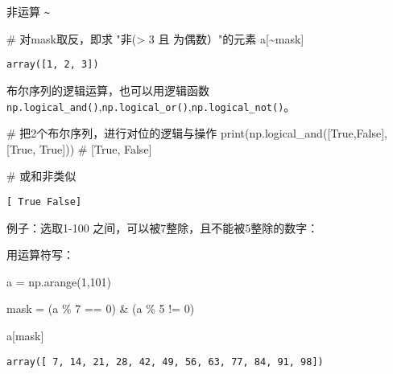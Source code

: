 \documentclass[
  letterpaper,
  DIV=11,
  numbers=noendperiod]{scrreprt}
\newenvironment{Shaded}{\begin{snugshade}}{\end{snugshade}}
\newcommand{\BuiltInTok}[1]{\textcolor[rgb]{0.00,0.23,0.31}{#1}}
\newcommand{\CommentTok}[1]{\textcolor[rgb]{0.37,0.37,0.37}{#1}}
\newcommand{\DecValTok}[1]{\textcolor[rgb]{0.68,0.00,0.00}{#1}}
\newcommand{\NormalTok}[1]{\textcolor[rgb]{0.00,0.23,0.31}{#1}}
\newcommand{\OperatorTok}[1]{\textcolor[rgb]{0.37,0.37,0.37}{#1}}
\newcommand{\VariableTok}[1]{\textcolor[rgb]{0.07,0.07,0.07}{#1}}
\begin{document}
非运算 \texttt{\textasciitilde{}}

\begin{Shaded}
\begin{Highlighting}[]
\CommentTok{\# 对mask取反，即求 "非(\textgreater{} 3 且 为偶数）"的元素 }
\NormalTok{a[}\OperatorTok{\textasciitilde{}}\NormalTok{mask]}
\end{Highlighting}
\end{Shaded}

\begin{verbatim}
array([1, 2, 3])
\end{verbatim}

布尔序列的逻辑运算，也可以用逻辑函数
\texttt{np.logical\_and()},\texttt{np.logical\_or()},\texttt{np.logical\_not()}。

\begin{Shaded}
\begin{Highlighting}[]
\CommentTok{\# 把2个布尔序列，进行对位的逻辑与操作}
\BuiltInTok{print}\NormalTok{(np.logical\_and([}\VariableTok{True}\NormalTok{,}\VariableTok{False}\NormalTok{],[}\VariableTok{True}\NormalTok{, }\VariableTok{True}\NormalTok{])) }\CommentTok{\# [True, False] }

\CommentTok{\# 或和非类似}
\end{Highlighting}
\end{Shaded}

\begin{verbatim}
[ True False]
\end{verbatim}

例子：选取1-100 之间，可以被7整除，且不能被5整除的数字：

用运算符写：

\begin{Shaded}
\begin{Highlighting}[]
\NormalTok{a }\OperatorTok{=}\NormalTok{ np.arange(}\DecValTok{1}\NormalTok{,}\DecValTok{101}\NormalTok{)}

\NormalTok{mask }\OperatorTok{=}\NormalTok{ (a }\OperatorTok{\%} \DecValTok{7} \OperatorTok{==} \DecValTok{0}\NormalTok{) }\OperatorTok{\&}\NormalTok{ (a }\OperatorTok{\%} \DecValTok{5} \OperatorTok{!=} \DecValTok{0}\NormalTok{)}

\NormalTok{a[mask]}
\end{Highlighting}
\end{Shaded}

\begin{verbatim}
array([ 7, 14, 21, 28, 42, 49, 56, 63, 77, 84, 91, 98])
\end{verbatim}
\end{document}
